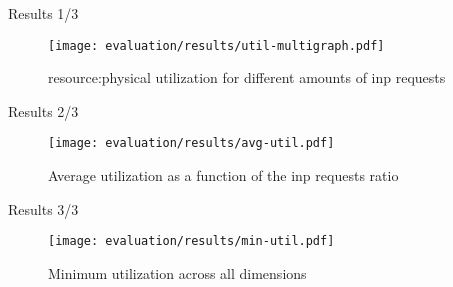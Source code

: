 \begin{frame}{Results 1/3}
    \begin{figure}
        \captionsetup{font=scriptsize}
        \texttt{[image: evaluation/results/util-multigraph.pdf]}
        \caption{\Gls{resource:physical} utilization for different amounts of \gls{inp} requests}
    \end{figure}
\end{frame}

\begin{frame}{Results 2/3}
    \vspace{4mm}
    \begin{figure}
        \captionsetup{font=footnotesize}
        \texttt{[image: evaluation/results/avg-util.pdf]}
        \vspace{2mm}
        \caption{Average  utilization as a function of the \gls{inp} requests ratio}
    \end{figure}
\end{frame}

\begin{frame}{Results 3/3}
    \vspace{4mm}
    \begin{figure}
        \captionsetup{font=footnotesize}
        \texttt{[image: evaluation/results/min-util.pdf]}
        \vspace{2mm}
        \caption{Minimum  utilization across all dimensions}
    \end{figure}
\end{frame}
